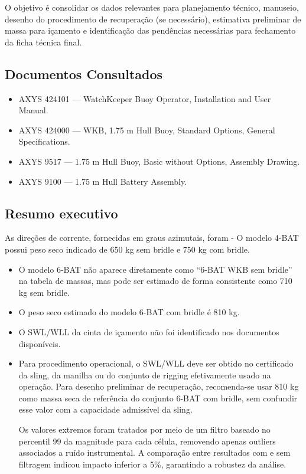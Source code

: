 \documentclass[a4paper,12pt]{article}
\begin{document}
O objetivo é consolidar os dados relevantes para planejamento técnico, manuseio, desenho do procedimento de recuperação (se necessário), estimativa preliminar de massa para içamento e identificação das pendências necessárias para fechamento da ficha técnica final.

\subsection{Documentos Consultados}

\begin{itemize}
  \item AXYS 424101 — WatchKeeper Buoy Operator, Installation and User Manual.
  \item AXYS 424000 — WKB, 1.75 m Hull Buoy, Standard Options, General Specifications.
  \item AXYS 9517 — 1.75 m Hull Buoy, Basic without Options, Assembly Drawing.
  \item AXYS 9100 — 1.75 m Hull Battery Assembly.
\end{itemize}

\subsection{Resumo executivo}

As direções de corrente, fornecidas em graus azimutais, foram - O modelo 4-BAT possui peso seco indicado de 650 kg sem bridle e 750 kg com bridle.

\begin{itemize}
  \item O modelo 6-BAT não aparece diretamente como “6-BAT WKB sem bridle” na tabela de massas, mas pode ser estimado de forma consistente como 710 kg sem bridle.
  \item O peso seco estimado do modelo 6-BAT com bridle é 810 kg.
  \item O SWL/WLL da cinta de içamento não foi identificado nos documentos disponíveis.
  \item Para procedimento operacional, o SWL/WLL deve ser obtido no certificado da sling, da manilha ou do conjunto de rigging efetivamente usado na operação.
   Para desenho preliminar de recuperação, recomenda-se usar 810 kg como massa seca de referência do conjunto 6-BAT com bridle, sem confundir esse valor com a capacidade admissível da sling.

Os valores extremos foram tratados por meio de um filtro baseado no percentil 99 da magnitude para cada célula, removendo apenas outliers associados a ruído instrumental. A comparação entre resultados com e sem filtragem indicou impacto inferior a 5\%, garantindo a robustez da análise.

\end{itemize}
\end{document}
